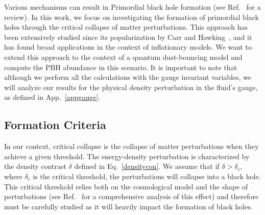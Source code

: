 \documentclass[a4paper,11pt]{article}
\begin{document}
Various mechanisms can result in Primordial black hole formation (see Ref.~\cite{Escriva2023} for a review). In this work, we focus on investigating the formation of primordial black holes through the critical collapse of matter perturbations. This approach has been extensively studied since its popularization by Carr and Hawking~\cite{Hawking1971, Carr1974}, and it has found broad applications in the context of inflationary models. We want to extend this approach to the context of a quantum dust-bouncing model and compute the PBH abundance in this scenario. It is important to note that although we perform all the calculations with the gauge invariant variables, we will analyze our results for the physical density perturbation in the fluid's gauge, as defined in App.~\ref{appgauge}.

\subsection{Formation Criteria}

In our context, critical collapse is the collapse of matter perturbations when they achieve a given threshold. The energy-density perturbation is characterized by the density contrast $\delta$ defined in Eq.~\eqref{densitycon}. We assume that if $\delta > \delta_c$, where $\delta_c$ is the critical threshold, the perturbations will collapse into a black hole. This critical threshold relies both on the cosmological model and the shape of perturbations (see Ref.~\cite{Niemeyer1998, Musco2019} for a comprehensive analysis of this effect) and therefore must be carefully studied as it will heavily impact the formation of black holes.
\end{document}
